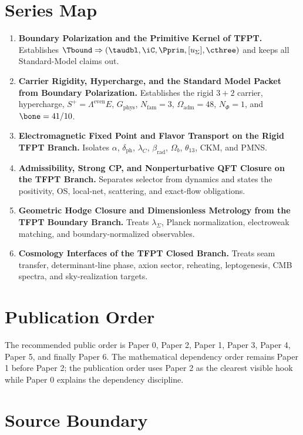 \section{Series Map}

\begin{enumerate}[leftmargin=1.5em]
    \item \textbf{Boundary Polarization and the Primitive Kernel of TFPT.}
    Establishes $\Tbound\Rightarrow(\taudbl,\iC,\Pprim,[u_\Sigma],\cthree)$ and keeps all
    Standard-Model claims out.
    \item \textbf{Carrier Rigidity, Hypercharge, and the Standard Model Packet from Boundary
    Polarization.}
    Establishes the rigid $3+2$ carrier, hypercharge, $S^+=\Lambda^{\mathrm{even}}E$,
    $G_{\mathrm{phys}}$, $N_{\mathrm{fam}}=3$, $\Omega_{\mathrm{adm}}=48$, $N_\Phi=1$, and
    $\bone=41/10$.
    \item \textbf{Electromagnetic Fixed Point and Flavor Transport on the Rigid TFPT Branch.}
    Isolates $\alpha$, $\delta_{\mathrm{ph}}$, $\lambda_C$, $\beta_{\mathrm{rad}}$, $\Omega_b$,
    $\theta_{13}$, CKM, and PMNS.
    \item \textbf{Admissibility, Strong CP, and Nonperturbative QFT Closure on the TFPT Branch.}
    Separates selector from dynamics and states the positivity, OS, local-net, scattering, and
    exact-flow obligations.
    \item \textbf{Geometric Hodge Closure and Dimensionless Metrology from the TFPT Boundary
    Branch.}
    Treats $\lambda_\Sigma$, Planck normalization, electroweak matching, and boundary-normalized
    observables.
    \item \textbf{Cosmology Interfaces of the TFPT Closed Branch.}
    Treats seam transfer, determinant-line phase, axion sector, reheating, leptogenesis, CMB
    spectra, and sky-realization targets.
\end{enumerate}

\section{Publication Order}

The recommended public order is Paper 0, Paper 2, Paper 1, Paper 3, Paper 4, Paper 5, and finally
Paper 6. The mathematical dependency order remains Paper 1 before Paper 2; the publication order
uses Paper 2 as the clearest visible hook while Paper 0 explains the dependency discipline.

\section{Source Boundary}


